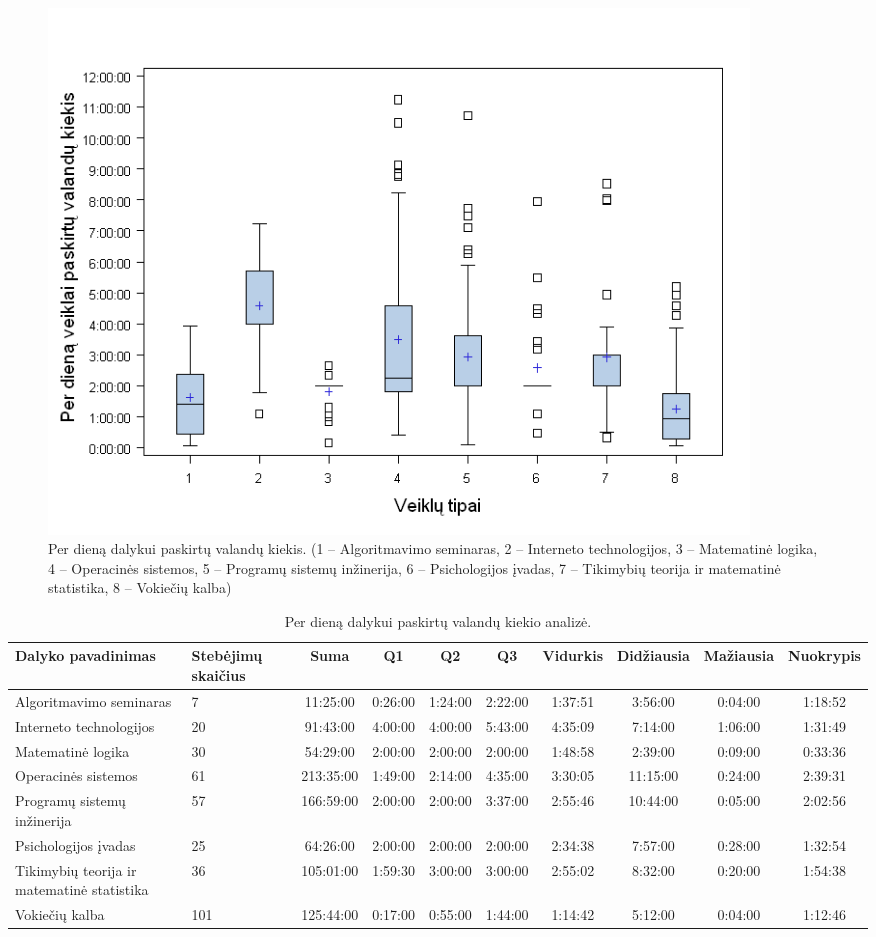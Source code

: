 \begin{figure}[H]
  \centering
    \includegraphics[width=0.9\textwidth]{images/day_duration.png}
  \caption{
    Per dieną dalykui paskirtų valandų kiekis.
    (1 – Algoritmavimo seminaras,
    2 – Interneto technologijos,
    3 – Matematinė logika,
    4 – Operacinės sistemos,
    5 – Programų sistemų inžinerija,
    6 – Psichologijos įvadas,
    7 – Tikimybių teorija ir matematinė statistika,
    8 – Vokiečių kalba)}
  \label{fig:day_duration}
\end{figure}

\begin{table}
  \centering
  \begin{tabular}{|p{7em}|p{4em}|c|c|c|c|c|c|c|c|}
\hline
Dalyko pavadinimas&Stebėjimų skaičius&Suma&Q1&Q2&Q3&Vidurkis&Didžiausia&Mažiausia&Nuokrypis\\
\hline
Algoritmavimo seminaras&7&11:25:00&0:26:00&1:24:00&2:22:00&1:37:51&3:56:00&0:04:00&1:18:52\\
Interneto technologijos&20&91:43:00&4:00:00&4:00:00&5:43:00&4:35:09&7:14:00&1:06:00&1:31:49\\
Matematinė logika&30&54:29:00&2:00:00&2:00:00&2:00:00&1:48:58&2:39:00&0:09:00&0:33:36\\
Operacinės sistemos&61&213:35:00&1:49:00&2:14:00&4:35:00&3:30:05&11:15:00&0:24:00&2:39:31\\
Programų sistemų inžinerija&57&166:59:00&2:00:00&2:00:00&3:37:00&2:55:46&10:44:00&0:05:00&2:02:56\\
Psichologijos įvadas&25&64:26:00&2:00:00&2:00:00&2:00:00&2:34:38&7:57:00&0:28:00&1:32:54\\
Tikimybių teorija ir matematinė statistika&36&105:01:00&1:59:30&3:00:00&3:00:00&2:55:02&8:32:00&0:20:00&1:54:38\\
Vokiečių kalba&101&125:44:00&0:17:00&0:55:00&1:44:00&1:14:42&5:12:00&0:04:00&1:12:46\\
\hline
  \end{tabular}
  \caption{Per dieną dalykui paskirtų valandų kiekio analizė.}
  \label{tab:day_duration}
\end{table}


